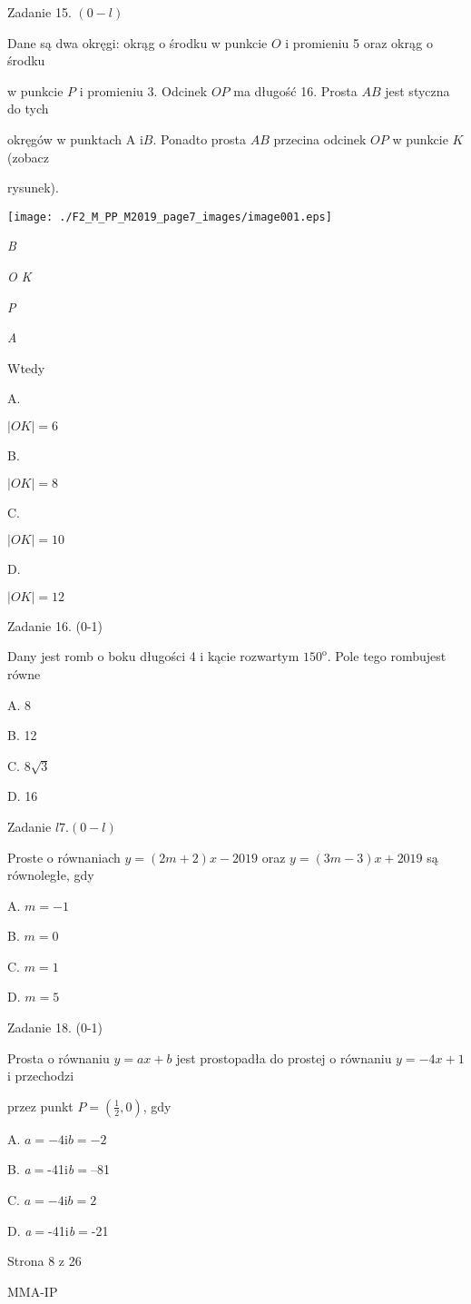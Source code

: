 \documentclass[a4paper,12pt]{article}
\begin{document}
Zadanie 15. $(0-l)$

Dane są dwa okręgi: okrąg o środku w punkcie $O$ i promieniu 5 oraz okrąg o środku

w punkcie $P$ i promieniu 3. Odcinek $OP$ ma długość 16. Prosta $AB$ jest styczna do tych

okręgów w punktach A $\mathrm{i}B$. Ponadto prosta $AB$ przecina odcinek $OP$ w punkcie $K$ (zobacz

rysunek).
\begin{center}
\texttt{[image: ./F2\_M\_PP\_M2019\_page7\_images/image001.eps]}
\end{center}
{\it B}

{\it O  K}

{\it P}

{\it A}

Wtedy

A.

$|OK|=6$

B.

$|OK|=8$

C.

$|OK|=10$

D.

$|OK|=12$

Zadanie 16. (0-1)

Dany jest romb o boku długości 4 i kącie rozwartym $150^{\mathrm{o}}$. Pole tego rombujest równe

A. 8

B. 12

C. $8\sqrt{3}$

D. 16

Zadanie $l7. (0-l)$

Proste o równaniach $y=(2m+2)x-2019$ oraz $y=(3m-3)x+2019$ są równoległe, gdy

A. $m=-1$

B. $m=0$

C. $m=1$

D. $m=5$

Zadanie 18. (0-1)

Prosta o równaniu $y=ax+b$ jest prostopadła do prostej o równaniu $y=-4x+1$ i przechodzi

przez punkt $P=(\displaystyle \frac{1}{2},0)$, gdy

A. $a=-4\mathrm{i}b=-2$

B. {\it a}$=$-41i{\it b}$=$--81

C. $a=-4\mathrm{i}b=2$

D. {\it a}$=$-41i{\it b}$=$-21

Strona 8 z 26

MMA-IP
\end{document}
